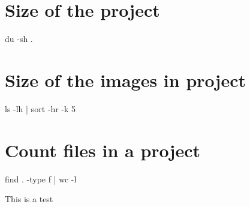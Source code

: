 \documentclass{report}
\begin{document}
\section{Size of the project}

\bash[stdout]
du -sh .
\END

\section{Size of the images in project}
\bash[stdout]
ls -lh | sort -hr -k 5
\END

\section{Count files in a project}
\bash[stdout]
find . -type f | wc -l
\END

This is a test
\end{document}
